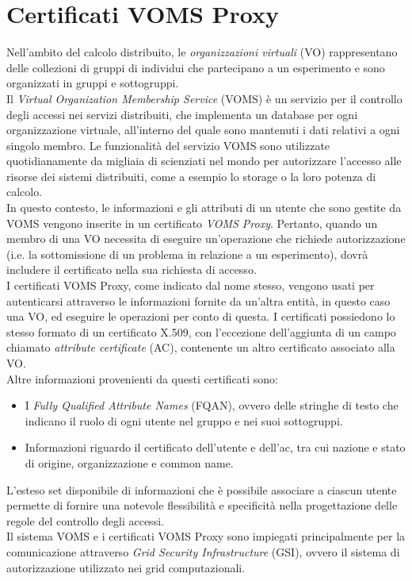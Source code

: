 \section{Certificati VOMS Proxy}
Nell'ambito del calcolo distribuito, le \textit{organizzazioni virtuali} (VO) rappresentano delle collezioni di gruppi 
di individui che partecipano a un esperimento e sono organizzati in gruppi e sottogruppi. 
\\Il \textit{Virtual Organization Membership Service} (VOMS) \cite{voms_res_1} è un servizio per il controllo degli accessi 
nei servizi distribuiti, che implementa
un database per ogni organizzazione virtuale, all'interno del
quale sono mantenuti i dati relativi a ogni singolo membro. Le funzionalità del servizio VOMS sono utilizzate quotidianamente da 
migliaia di scienziati nel mondo per autorizzare l'accesso alle risorse dei sistemi distribuiti, come a esempio lo storage o la
loro potenza di calcolo. 
\\ In questo contesto, le informazioni e gli attributi di un utente che sono gestite da VOMS vengono inserite in un certificato \textit{VOMS Proxy}.
Pertanto, quando un membro di una VO necessita di eseguire un'operazione che richiede autorizzazione (i.e. la sottomissione di un problema in relazione a un esperimento), 
dovrà includere il certificato nella sua richiesta di accesso. 
\\ I certificati VOMS Proxy, come indicato dal nome stesso, vengono usati per autenticarsi attraverso le informazioni fornite da un'altra entità, in questo caso una VO, ed eseguire le operazioni
per conto di questa. I certificati possiedono lo stesso formato di un certificato X.509, con l'eccezione dell'aggiunta di un campo chiamato \textit{attribute certificate} (AC),
 contenente un altro certificato associato alla VO. 
\\ Altre informazioni provenienti da questi certificati sono:
\begin{itemize}
    \item I \textit{Fully Qualified Attribute Names} (FQAN), ovvero delle stringhe di testo che indicano il ruolo di ogni utente nel gruppo e nei suoi sottogruppi. 
    \item Informazioni riguardo il certificato dell'utente e dell'ac, tra cui nazione e stato di origine, organizzazione e common name.   
\end{itemize}
L'esteso set disponibile di informazioni che è possibile associare a ciascun utente permette di fornire
 una notevole flessibilità e specificità nella progettazione delle regole del controllo degli accessi. 
 \\ Il sistema VOMS e i certificati VOMS Proxy sono impiegati principalmente per la comunicazione attraverso \textit{Grid Security Infrastructure} (GSI), ovvero 
il sistema di autorizzazione utilizzato nei grid computazionali. 

